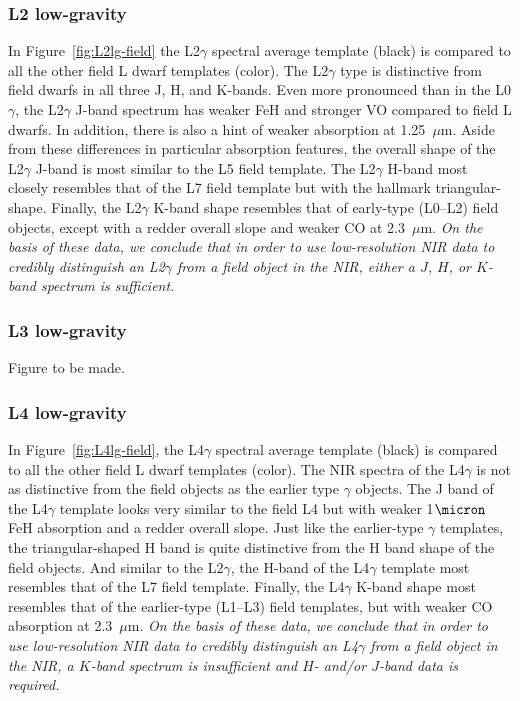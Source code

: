 \documentclass[12pt,preprint]{aastex}
\begin{document}
\subsubsection{L2 low-gravity}
In Figure~\ref{fig:L2lg-field} the L2$\gamma$ spectral average template (black) is compared to all the other field L dwarf templates (color). The L2$\gamma$ type is distinctive from field dwarfs in all three J, H, and K-bands. 
Even more pronounced than in the L0$\gamma$, the L2$\gamma$ J-band spectrum has weaker FeH and stronger VO compared to field L dwarfs. 
In addition, there is also a hint of weaker  absorption at 1.25~$\mu$m. Aside from these differences in particular absorption features, the overall shape of the L2$\gamma$ J-band is most similar to the L5 field template.
The L2$\gamma$ H-band most closely resembles that of the L7 field template but with the hallmark  triangular-shape. 
Finally, the L2$\gamma$ K-band shape resembles that of early-type (L0--L2) field objects, except with a redder overall slope and weaker CO at 2.3~$\mu$m. 
\emph{On the basis of these data, we conclude that in order to use low-resolution NIR data to credibly distinguish an L2$\gamma$ from a field object in the NIR, either a $J$, $H$, or $K$-band spectrum is sufficient.}

\subsubsection{L3 low-gravity}
Figure to be made.

\subsubsection{L4 low-gravity}
In Figure~\ref{fig:L4lg-field}, the L4$\gamma$ spectral average template (black) is compared to all the other field L dwarf templates (color). 
The NIR spectra of the L4$\gamma$ is not as distinctive from the field objects as the earlier type $\gamma$ objects. 
The J band of the L4$\gamma$ template looks very similar to the field L4 but with weaker 1$\micron$ FeH absorption and a redder overall slope. 
Just like the earlier-type $\gamma$ templates, the triangular-shaped H band is quite distinctive from the H band shape of the field objects. And similar to the L2$\gamma$, the H-band of the L4$\gamma$ template most resembles that of the L7 field template.
Finally, the L4$\gamma$ K-band shape most resembles that of the earlier-type (L1--L3) field templates, but with weaker CO absorption at 2.3~$\mu$m.
\emph{On the basis of these data, we conclude that in order to use low-resolution NIR data to credibly distinguish an L4$\gamma$ from a field object in the NIR, a $K$-band spectrum is insufficient and $H$- and/or $J$-band data is required.}
\end{document}
